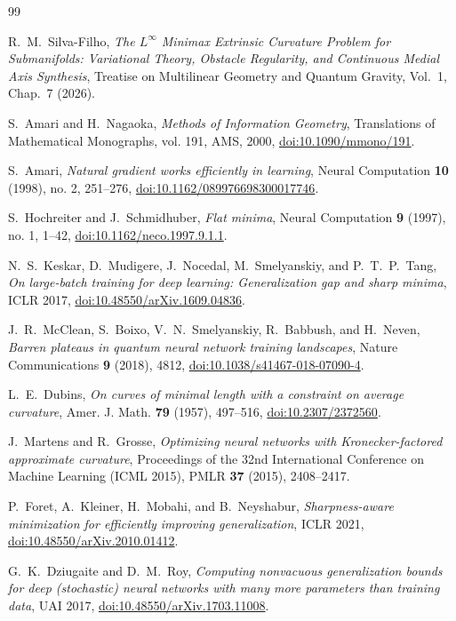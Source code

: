 \documentclass[11pt,reqno]{amsart}
\theoremstyle{definition}
\numberwithin{equation}{section}
\begin{document}
\begin{thebibliography}{99}

R.~M.~Silva-Filho,
\emph{The $L^\infty$ Minimax Extrinsic Curvature Problem for Submanifolds: Variational Theory, Obstacle Regularity, and Continuous Medial Axis Synthesis},
Treatise on Multilinear Geometry and Quantum Gravity, Vol.~1, Chap.~7 (2026).

S.~Amari and H.~Nagaoka,
\emph{Methods of Information Geometry},
Translations of Mathematical Monographs, vol. 191, AMS, 2000, \href{https://doi.org/10.1090/mmono/191}{doi:10.1090/mmono/191}.

S.~Amari,
\emph{Natural gradient works efficiently in learning},
Neural Computation \textbf{10} (1998), no. 2, 251--276, \href{https://doi.org/10.1162/089976698300017746}{doi:10.1162/089976698300017746}.

S.~Hochreiter and J.~Schmidhuber,
\emph{Flat minima},
Neural Computation \textbf{9} (1997), no. 1, 1--42, \href{https://doi.org/10.1162/neco.1997.9.1.1}{doi:10.1162/neco.1997.9.1.1}.

N.~S.~Keskar, D.~Mudigere, J.~Nocedal, M.~Smelyanskiy, and P.~T.~P.~Tang,
\emph{On large-batch training for deep learning: Generalization gap and sharp minima},
ICLR 2017, \href{https://doi.org/10.48550/arXiv.1609.04836}{doi:10.48550/arXiv.1609.04836}.

J.~R.~McClean, S.~Boixo, V.~N.~Smelyanskiy, R.~Babbush, and H.~Neven,
\emph{Barren plateaus in quantum neural network training landscapes},
Nature Communications \textbf{9} (2018), 4812, \href{https://doi.org/10.1038/s41467-018-07090-4}{doi:10.1038/s41467-018-07090-4}.

L.~E.~Dubins,
\emph{On curves of minimal length with a constraint on average curvature},
Amer. J. Math. \textbf{79} (1957), 497--516, \href{https://doi.org/10.2307/2372560}{doi:10.2307/2372560}.

J.~Martens and R.~Grosse,
\emph{Optimizing neural networks with Kronecker-factored approximate curvature},
Proceedings of the 32nd International Conference on Machine Learning (ICML 2015), PMLR \textbf{37} (2015), 2408--2417.

P.~Foret, A.~Kleiner, H.~Mobahi, and B.~Neyshabur,
\emph{Sharpness-aware minimization for efficiently improving generalization},
ICLR 2021, \href{https://doi.org/10.48550/arXiv.2010.01412}{doi:10.48550/arXiv.2010.01412}.

G.~K.~Dziugaite and D.~M.~Roy,
\emph{Computing nonvacuous generalization bounds for deep (stochastic) neural networks with many more parameters than training data},
UAI 2017, \href{https://doi.org/10.48550/arXiv.1703.11008}{doi:10.48550/arXiv.1703.11008}.

\end{thebibliography}
\end{document}
